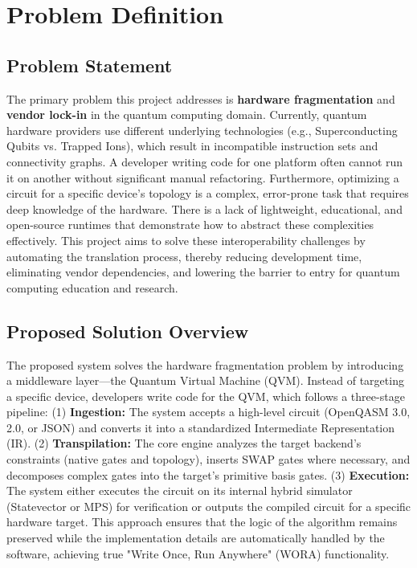 
\chapter{Problem Definition}

\section{Problem Statement}

The primary problem this project addresses is \textbf{hardware fragmentation} and \textbf{vendor lock-in} in the quantum computing domain. Currently, quantum hardware providers use different underlying technologies (e.g., Superconducting Qubits vs. Trapped Ions), which result in incompatible instruction sets and connectivity graphs. A developer writing code for one platform often cannot run it on another without significant manual refactoring. Furthermore, optimizing a circuit for a specific device's topology is a complex, error-prone task that requires deep knowledge of the hardware. There is a lack of lightweight, educational, and open-source runtimes that demonstrate how to abstract these complexities effectively. This project aims to solve these interoperability challenges by automating the translation process, thereby reducing development time, eliminating vendor dependencies, and lowering the barrier to entry for quantum computing education and research.




\section{Proposed Solution Overview}

The proposed system solves the hardware fragmentation problem by introducing a middleware layer—the Quantum Virtual Machine (QVM). Instead of targeting a specific device, developers write code for the QVM, which follows a three-stage pipeline: (1) \textbf{Ingestion:} The system accepts a high-level circuit (OpenQASM 3.0, 2.0, or JSON) and converts it into a standardized Intermediate Representation (IR). (2) \textbf{Transpilation:} The core engine analyzes the target backend's constraints (native gates and topology), inserts SWAP gates where necessary, and decomposes complex gates into the target's primitive basis gates. (3) \textbf{Execution:} The system either executes the circuit on its internal hybrid simulator (Statevector or MPS) for verification or outputs the compiled circuit for a specific hardware target. This approach ensures that the logic of the algorithm remains preserved while the implementation details are automatically handled by the software, achieving true "Write Once, Run Anywhere" (WORA) functionality.



